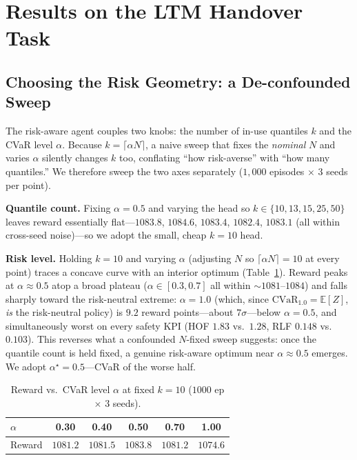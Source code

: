 \documentclass[conference]{IEEEtran}
\begin{document}
\section{Results on the LTM Handover Task}
\label{sec:results}

\subsection{Choosing the Risk Geometry: a De-confounded Sweep}
\label{sec:results-sweep}
The risk-aware agent couples two knobs: the number of in-use quantiles $k$ and
the CVaR level $\alpha$. Because $k=\lceil\alpha N\rceil$, a naive sweep that
fixes the \emph{nominal} $N$ and varies $\alpha$ silently changes $k$ too,
conflating ``how risk-averse'' with ``how many quantiles.'' We therefore sweep
the two axes separately ($1{,}000$ episodes $\times$ $3$ seeds per point).

\textbf{Quantile count.} Fixing $\alpha=0.5$ and varying the head so
$k\in\{10,13,15,25,50\}$ leaves reward essentially flat---$1083.8$, $1084.6$,
$1083.4$, $1082.4$, $1083.1$ (all within cross-seed noise)---so we adopt the
small, cheap $k=10$ head.

\textbf{Risk level.} Holding $k=10$ and varying $\alpha$ (adjusting $N$ so
$\lceil\alpha N\rceil=10$ at every point) traces a concave curve with an
interior optimum (Table~\ref{tab:alpha}). Reward peaks at $\alpha\approx0.5$
atop a broad plateau ($\alpha\in[0.3,0.7]$ all within $\sim\!1081$--$1084$) and
falls sharply toward the risk-neutral extreme: $\alpha=1.0$ (which, since
$\mathrm{CVaR}_{1.0}=\mathbb{E}[Z]$, \emph{is} the risk-neutral policy) is
$9.2$ reward points---about $7\sigma$---below $\alpha=0.5$, and simultaneously
worst on every safety KPI (HOF $1.83$ vs.\ $1.28$, RLF $0.148$ vs.\ $0.103$).
This reverses what a confounded $N$-fixed sweep suggests: once the quantile
count is held fixed, a genuine risk-aware optimum near $\alpha\approx0.5$
emerges. We adopt $\alpha^\star=0.5$---CVaR of the worse half.

\begin{table}[htbp]
\caption{Reward vs.\ CVaR level $\alpha$ at fixed $k=10$ ($1000$ ep $\times$ $3$ seeds).}
\label{tab:alpha}
\begin{center}
\begin{tabular}{|l|c|c|c|c|c|}
\hline
$\alpha$ & 0.30 & 0.40 & 0.50 & 0.70 & 1.00 \\
\hline
Reward & $1081.2$ & $1081.5$ & $\mathbf{1083.8}$ & $1081.2$ & $1074.6$ \\
\hline
\end{tabular}
\end{center}
\end{table}
\end{document}
